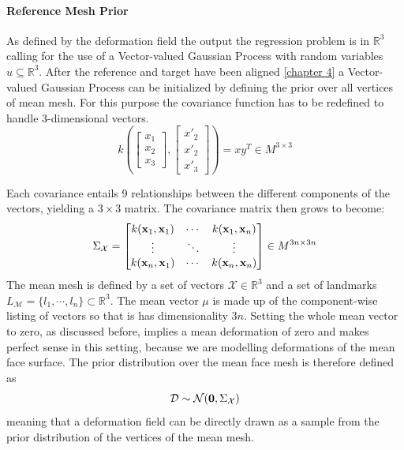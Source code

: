\paragraph{Reference Mesh Prior}
As defined by the deformation field the output the regression problem is in $\mathbb{R}^3$ calling for the use of a Vector-valued Gaussian Process with random variables $u \subseteq \mathbb{R}^3$. 
After the reference and target have been aligned \ref{chapter 4} a Vector-valued Gaussian Process can be initialized by defining the prior over all vertices of mean mesh. For this purpose the covariance function has to be redefined to handle 3-dimensional vectors.
\begin{equation}
    k\left(
    \begin{bmatrix}x_{1}\\x_{2}\\x_{3}\end{bmatrix},
    \begin{bmatrix}x'_{2}\\x'_{2}\\x'_{3}\end{bmatrix}
    \right) = x y^T \in M^{3 \times 3}
\end{equation}

Each covariance entails 9 relationships between the different components of the vectors, yielding a $3 \times 3$ matrix. The covariance matrix then grows to become: 
\begin{equation}
    \Sigma_{\mathcal{X}} = 
\begin{bmatrix}
    k(\textbf{x}_{1},\textbf{x}_{1}) & \cdots & k(\textbf{x}_{1},\textbf{x}_{n}) \\
\vdots & \ddots & \vdots \\
k(\textbf{x}_{n},\textbf{x}_{1}) & \cdots & k(\textbf{x}_{n},\textbf{x}_{n})
\end{bmatrix} \in M^{3n \times 3n}
\end{equation}
The mean mesh is defined by a set of vectors $\mathcal{X} \in \mathbb{R}^3$ and a set of landmarks $L_\mathcal{M}=\{l_{1}, \cdots, l_{n}\} \subset \mathbb{R}^3$.
The mean vector $\mu$ is made up of the component-wise listing of vectors so that is has dimensionality $3n$. Setting the whole mean vector to zero, as discussed before, implies a mean deformation of zero and makes perfect sense in this setting, because we are modelling deformations of the mean face surface. 
The prior distribution over the mean face mesh is therefore defined as 
\begin{equation}
    \mathcal{D} \sim \mathcal{N}(\textbf{0}, \Sigma_{\mathcal{X}})
\end{equation}
meaning that a deformation field can be directly drawn as a sample from the prior distribution of the vertices of the mean mesh. 

